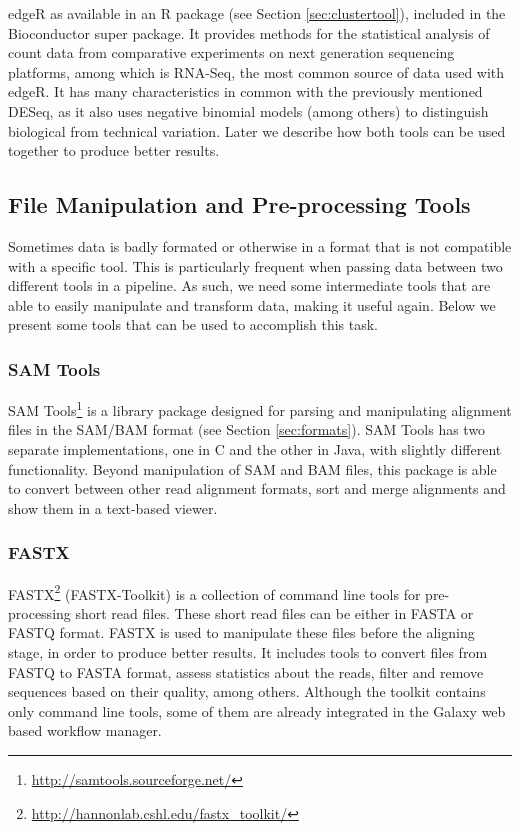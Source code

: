 edgeR \cite{robinson2010edger} as available in an R package (see Section
\ref{sec:clustertool}), included in the Bioconductor super package. It provides
methods for the statistical analysis of count data from comparative experiments
on next generation sequencing platforms, among which is RNA-Seq, the most common
source of data used with edgeR. It has many characteristics in common with the
previously mentioned DESeq, as it also uses negative binomial models (among
others) to distinguish biological from technical variation. Later we describe
how both tools can be used together to produce better results.

\subsection{File Manipulation and Pre-processing Tools}

Sometimes data is badly formated or otherwise in a format that is not compatible
with a specific tool. This is particularly frequent when passing data between
two different tools in a pipeline. As such, we need some intermediate tools that
are able to easily manipulate and transform data, making it useful again. Below
we present some tools that can be used to accomplish this task.

\subsubsection*{SAM Tools}

SAM Tools\footnote{\url{http://samtools.sourceforge.net/}} is a library
package designed for parsing and manipulating alignment files in the SAM/BAM
format \cite{Li2009} (see Section \ref{sec:formats}). SAM Tools has two separate
implementations, one in C and the other in Java, with slightly different
functionality. Beyond manipulation of SAM and BAM files, this package is able to
convert between other read alignment formats, sort and merge alignments and show
them in a text-based viewer.

\subsubsection*{FASTX}

FASTX\footnote{\url{http://hannonlab.cshl.edu/fastx_toolkit/}} (FASTX-Toolkit)
is a collection of command line tools for pre-processing short read files. These
short read files can be either in FASTA or FASTQ format. FASTX is used to
manipulate these files before the aligning stage, in order to produce better
results. It includes tools to convert files from FASTQ to FASTA format, assess
statistics about the reads, filter and remove sequences based on their quality,
among others. Although the toolkit contains only command line tools, some of
them are already integrated in the Galaxy web based workflow manager.

